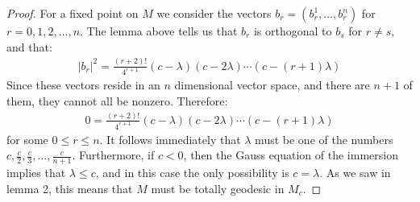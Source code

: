 \documentclass[11pt]{amsart}
\theoremstyle{definition}
\theoremstyle{definition}
\begin{document}
\begin{proof} For a fixed point on $M$ we consider the vectors $b_r = ( b^1_r, \ldots, b^n_r )$ for $r = 0,1,2, \ldots, n$.  The lemma above tells us that $b_r$ is orthogonal to $b_s$ for $r \neq s$, and that:
%
\begin{align*}
| b_r |^2 = \frac{(r + 2)!}{4^{r + 1}} (c - \lambda)(c - 2 \lambda) \cdots (c - (r+1) \lambda)
\end{align*}
%
Since these vectors reside in an $n$ dimensional vector space, and there are $n+1$ of them, they cannot all be nonzero.  Therefore:
%
\begin{align*}
0 = \frac{(r + 2)!}{4^{r + 1}} (c - \lambda)(c - 2 \lambda) \cdots (c - (r+1) \lambda)
\end{align*}
%
for some $0 \leq r \leq n$.  It follows immediately that $\lambda$ must be one of the numbers $c, \frac{c}{2}, \frac{c}{3}, \ldots, \frac{c}{n + 1}$.  Furthermore, if $c < 0$, then the Gauss equation of the immersion implies that $\lambda \leq c$, and in this case the only possibility is $c = \lambda$.  As we saw in lemma 2, this means that $M$ must be totally geodesic in $M_c$.
\end{proof}
\end{document}
